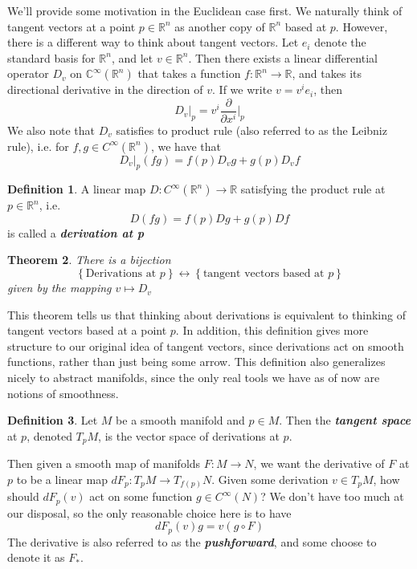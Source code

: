 \documentclass[psamsfonts]{amsart}
\newtheorem{thm}{Theorem}[section]
\theoremstyle{definition}
\newtheorem{defn}[thm]{Definition}
\theoremstyle{remark}
\newcommand{\R}{\mathbb{R}}
\newcommand{\ib}[1]{\textbf{\textit{#1}}}
\newcommand{\C}{\mathbb{C}}
\newcommand{\set}[1]{\left\lbrace #1 \right\rbrace}
\begin{document}
We'll provide some motivation in the Euclidean case first. We naturally
think of tangent vectors at a point $p \in \R^n$ as another copy of $\R^n$
based at $p$. However, there is a different way to think about tangent
vectors. Let $e_i$ denote the standard basis for $\R^n$, and let $v \in
\R^n$. Then there exists a linear differential operator $D_v$ on
$\C^\infty(\R^n)$ that takes a function $f: \R^n \to \R$, and takes its
directional derivative in the direction of $v$. If we write $v = v^ie_i$,
then
$$D_v\vert_p = v^i\frac{\partial}{\partial x^i}\bigg\vert_p $$
We also note that $D_v$ satisfies to product rule (also referred to as
the Leibniz rule), i.e. for $f,g \in C^\infty(\R^n)$, we have that
$$D_v\vert_p(fg) = f(p)D_vg + g(p)D_vf$$
\begin{defn}
	A linear map $D : C^\infty(\R^n) \to \R$ satisfying the product rule at $p \in \R^n$,
	i.e.
	$$D(fg) = f(p)Dg + g(p)Df$$
	is called a \ib{derivation at p}
\end{defn}
%
\begin{thm}
	There is a bijection
	$$\set{\text{Derivations at } p} \leftrightarrow
	\set{\text{tangent vectors based at } p}  $$
	given by the mapping $v \mapsto D_v$
\end{thm}
%
This theorem tells us that thinking about derivations is equivalent to thinking
of tangent vectors based at a point $p$. In addition, this definition gives
more structure to our original idea of tangent vectors, since derivations act
on smooth functions, rather than just being some arrow. This definition also
generalizes nicely to abstract manifolds, since the only real tools we have
as of now are notions of smoothness.
%
\begin{defn}
	Let $M$ be a smooth manifold and $p \in M$. Then the \ib{tangent space} at
	$p$, denoted $T_pM$, is the vector space of derivations at $p$.
\end{defn}
%
Then given a smooth map of manifolds $F: M \to N$, we want the derivative of $F$
at $p$ to be a linear map $dF_p : T_pM \to T_{f(p)}N$. Given some derivation
$v \in T_pM$, how should $dF_p(v)$ act on some function $g \in C^\infty(N)$?
We don't have too much at our disposal, so the only reasonable choice here is
to have
$$dF_p(v)g = v(g \circ F) $$
The derivative is also referred to as the \ib{pushforward}, and some choose
to denote it as $F_*$.\\
\end{document}

